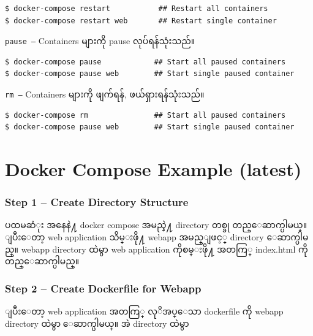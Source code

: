 \begin{verbatim}
$ docker-compose restart           ## Restart all containers
$ docker-compose restart web       ## Restart single container
\end{verbatim}

\texttt{pause\ –} Containers များကို pause လုပ်ရန်သုံးသည်။

\begin{verbatim}
$ docker-compose pause            ## Start all paused containers
$ docker-compose pause web        ## Start single paused container
\end{verbatim}

\texttt{rm\ –} Containers များကို ဖျက်ရန်, ဖယ်ရှားရန်သုံးသည်။

\begin{verbatim}
$ docker-compose rm               ## Start all paused containers
$ docker-compose pause web        ## Start single paused container
\end{verbatim}

\pagebreak

\hypertarget{docker-compose-example-latest}{%
\section{Docker Compose Example
(latest)}\label{docker-compose-example-latest}}

\hypertarget{step-1-create-directory-structure}{%
\subsubsection{Step 1 -- Create Directory Structure
}\label{step-1-create-directory-structure}}

ပထမဆံုး အနေနဲ႔ docker compose အမည္နဲ႔ directory တစ္ခု တည္ေဆာက္ပါမယ္။
ျပီးေတာ့ web application သိမ္းဖို႔ webapp အမည္ျဖင့္ directory
ေဆာက္ပါမည္။ webapp directory ထဲမွာ web application ကိုစမ္းဖို႔ အတကြ္
index.html ကို တည္ေဆာက္ပါမည္။

\hypertarget{step-2-create-dockerfile-for-webapp}{%
\subsubsection{Step 2 -- Create Dockerfile for Webapp
}\label{step-2-create-dockerfile-for-webapp}}

ျပီးေတာ့ web application အတကြ္ လုိအပ္ေသာ dockerfile ကို webapp directory
ထဲမွာ ေဆာက္ပါမယ္။ အဲ directory ထဲမွာ

\pagebreak

